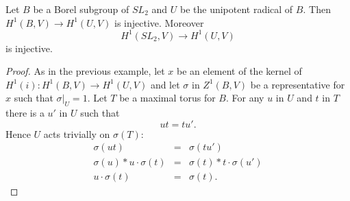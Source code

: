 \begin{lemma} Let $B$ be a Borel subgroup of $SL_2$ and $U$ be the unipotent radical of $B$. Then $H^1(B, V)\rightarrow H^1(U, V)$ is injective. Moreover
\begin{displaymath}
	H^1(SL_2, V)\rightarrow H^1(U, V)
\end{displaymath}
is injective.
\end{lemma}
\begin{proof}
As in the previous example, let $x$ be an element of the kernel of $H^1(i):H^1(B,V)\rightarrow H^1(U,V)$ and let $\sigma$ in $Z^1(B,V)$ be a representative for $x$ such that $\sigma|_U = 1$. Let $T$ be a maximal torus for $B$. For any $u$ in $U$ and $t$ in $T$ there is a $u'$ in $U$ such that
\begin{displaymath}
	ut = tu'.
\end{displaymath}
Hence $U$ acts trivially on $\sigma(T)$:
\begin{eqnarray*}
	\sigma(ut) &=& \sigma(tu')\\
	\sigma(u)*u\cdot\sigma(t) &=& \sigma(t)*t\cdot\sigma(u')\\
	u\cdot\sigma(t) &=& \sigma(t).
\end{eqnarray*}
\end{proof}
